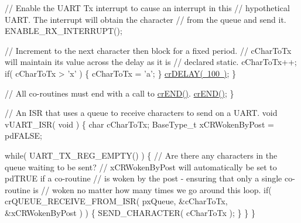 \begin{DoxyPre}        // Enable the UART Tx interrupt to cause an interrupt in this
     // hypothetical UART.  The interrupt will obtain the character
     // from the queue and send it.
     ENABLE\_RX\_INTERRUPT();\end{DoxyPre}



\begin{DoxyPre}     // Increment to the next character then block for a fixed period.
     // cCharToTx will maintain its value across the delay as it is
     // declared static.
     cCharToTx++;
     if( cCharToTx > 'x' )
     \{
        cCharToTx = 'a';
     \}
     \mbox{\hyperlink{croutine_8h_a05a06feb11028f2d1d440ea335f562ba}{crDELAY( 100 )}};
    \}\end{DoxyPre}



\begin{DoxyPre}    // All co-routines must end with a call to \mbox{\hyperlink{croutine_8h_ae6038cc976689b50000475ebfc4e2f23}{crEND()}}.
    \mbox{\hyperlink{croutine_8h_ae6038cc976689b50000475ebfc4e2f23}{crEND()}};
\}\end{DoxyPre}



\begin{DoxyPre}// An ISR that uses a queue to receive characters to send on a UART.
void vUART\_ISR( void )
\{
char cCharToTx;
BaseType\_t xCRWokenByPost = pdFALSE;\end{DoxyPre}



\begin{DoxyPre}    while( UART\_TX\_REG\_EMPTY() )
    \{
        // Are there any characters in the queue waiting to be sent?
     // xCRWokenByPost will automatically be set to pdTRUE if a co-routine
     // is woken by the post - ensuring that only a single co-routine is
     // woken no matter how many times we go around this loop.
        if( crQUEUE\_RECEIVE\_FROM\_ISR( pxQueue, \&cCharToTx, \&xCRWokenByPost ) )
     \{
         SEND\_CHARACTER( cCharToTx );
     \}
    \}
\}\end{DoxyPre}
 